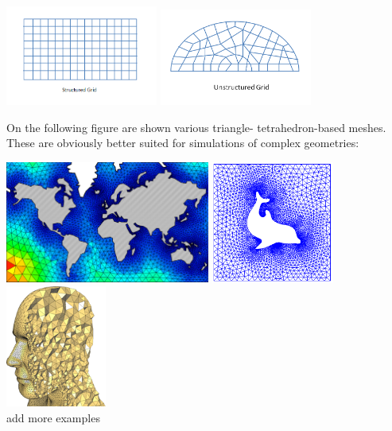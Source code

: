 \documentclass[a4paper]{article}
\begin{document}
\begin{center}
\includegraphics[width=5cm]{images/meshes/structured_grid}
\includegraphics[width=5cm]{images/meshes/unstructured_grid}
\end{center}

On the following figure are shown various triangle- tetrahedron-based meshes. 
These are obviously better suited for simulations of complex geometries:
\begin{center}
\includegraphics[height=4cm]{images/meshes/tr1.png}
\includegraphics[height=4cm]{images/meshes/dolfin.png}
\includegraphics[height=4cm]{images/meshes/tetra.png}\\
{\color{red} add more examples}
\end{center}
\end{document}
